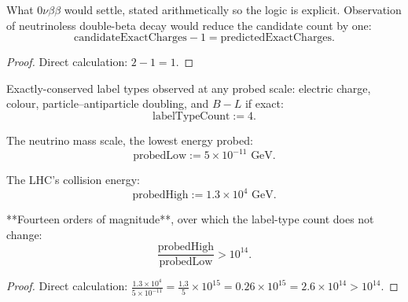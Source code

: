 \begin{theorem}
What $0\nu\beta\beta$ would settle, stated arithmetically so the logic is explicit.  Observation of neutrinoless double-beta decay would reduce the candidate count by one:
\begin{equation}
\text{candidateExactCharges} - 1 = \text{predictedExactCharges}.
\end{equation}
\begin{proof}
Direct calculation: $2 - 1 = 1$.
\end{proof}
\end{theorem}

\begin{definition}
Exactly-conserved label types observed at any probed scale: electric charge, colour, particle–antiparticle doubling, and $B - L$ if exact:
\begin{equation}
\text{labelTypeCount} := 4.
\end{equation}
\end{definition}

\begin{definition}
The neutrino mass scale, the lowest energy probed:
\begin{equation}
\text{probedLow} := 5 \times 10^{-11} \text{ GeV}.
\end{equation}
\end{definition}

\begin{definition}
The LHC's collision energy:
\begin{equation}
\text{probedHigh} := 1.3 \times 10^{4} \text{ GeV}.
\end{equation}
\end{definition}

\begin{theorem}
**Fourteen orders of magnitude**, over which the label-type count does not change:
\begin{equation}
\frac{\text{probedHigh}}{\text{probedLow}} > 10^{14}.
\end{equation}
\begin{proof}
Direct calculation: $\frac{1.3 \times 10^4}{5 \times 10^{-11}} = \frac{1.3}{5} \times 10^{15} = 0.26 \times 10^{15} = 2.6 \times 10^{14} > 10^{14}$.
\end{proof}
\end{theorem}

